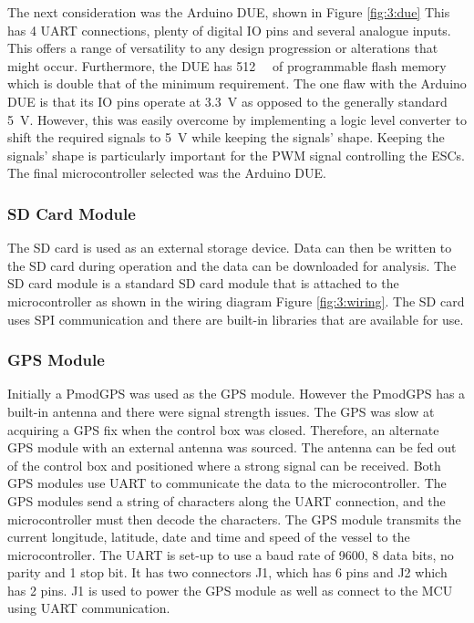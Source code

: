 		The next consideration was the Arduino DUE, shown in Figure \ref{fig:3:due} This has 4 UART connections, plenty of digital IO pins and several analogue inputs. This offers a range of versatility to any design progression or alterations that might occur. Furthermore, the DUE has \SI{512}{\kilo\byte} of programmable flash memory which is double that of the minimum requirement. The one flaw with the Arduino DUE is that its IO pins operate at \SI{3.3}{\volt} as opposed to the generally standard \SI{5}{\volt}. However, this was easily overcome by implementing a logic level converter to shift the required signals to \SI{5}{\volt} while keeping the signals' shape. Keeping the signals' shape is particularly important for the PWM signal controlling the ESCs. The final microcontroller selected was the Arduino DUE. \cite{Corporation2015}
		\subsubsection{SD Card Module}
		The SD card is used as an external storage device. Data can then be written to the SD card during operation and the data can be downloaded for analysis. The SD card module is a standard SD card module that is attached to the microcontroller as shown in the wiring diagram Figure \ref{fig:3:wiring}. The SD card uses SPI communication and there are built-in libraries that are available for use. \cite{Association2017}
		\subsubsection{GPS Module}
		Initially a PmodGPS was used as the GPS module. However the PmodGPS has a built-in antenna and there were signal strength issues. The GPS was slow at acquiring a GPS fix when the control box was closed. Therefore, an alternate GPS module with an external antenna was sourced. The antenna can be fed out of the control box and positioned where a strong signal can be received. Both GPS modules use UART to communicate the data to the microcontroller. The GPS modules send a string of characters along the UART connection, and the microcontroller must then decode the characters. The GPS module transmits the current longitude, latitude, date and time and speed of the vessel to the microcontroller. The UART is set-up to use a baud rate of 9600, 8 data bits, no parity and 1 stop bit. It has two connectors J1, which has 6 pins and J2 which has 2 pins. J1 is used to power the GPS module as well as connect to the MCU using UART communication. \cite{Robot}
